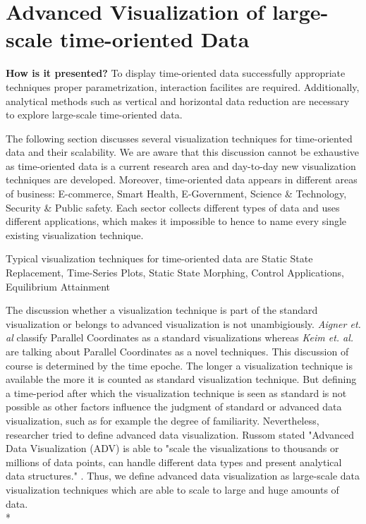 \section{Advanced Visualization of large-scale time-oriented Data}
\textbf{How is it presented?}
To display time-oriented data successfully appropriate techniques
proper parametrization,
interaction facilites are required\cite{Aigner2011}. Additionally, analytical methods such as vertical and horizontal data reduction are necessary to explore large-scale time-oriented data. 

The following section discusses several visualization techniques for time-oriented data and their scalability. We are aware that this discussion cannot be exhaustive as time-oriented data is a current research area and day-to-day new visualization techniques are developed.
Moreover, time-oriented data appears in different areas of business: E-commerce, Smart Health, E-Government, Science \& Technology, Security \& Public safety. Each sector collects different types of data and uses different applications, which makes it impossible to hence to name every single existing visualization technique.

Typical visualization techniques for time-oriented data are 
Static State Replacement,
Time-Series Plots,
Static State Morphing,
Control Applications,
Equilibrium Attainment

 The discussion whether a visualization technique is part of the standard visualization or belongs to advanced visualization is not unambigiously. \textit{Aigner et. al} classify Parallel Coordinates as a standard visualizations\cite{Aigner2011} whereas \textit{Keim et. al.} \cite{Keim} are talking about Parallel Coordinates as a novel techniques. This discussion of course is determined by the time epoche. The longer a visualization technique is available the more it is counted as standard visualization technique. But defining a time-period after which the visualization technique is seen as standard is not possible as other factors influence the judgment of standard or advanced data visualization, such as for example the degree of familiarity. Nevertheless, researcher tried to define advanced data visualization. Russom stated "Advanced Data Visualization (ADV) is able to "scale the visualizations to thousands or millions of data points, can handle different data types and present analytical data structures." \cite{Russom2011}. Thus, we define advanced data visualization as large-scale data visualization techniques which are able to scale to large and huge amounts of data. 
 \\*
